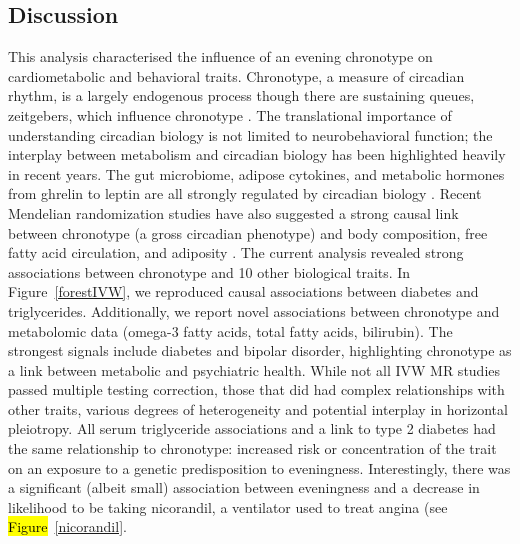 \documentclass[genes,article,accept,moreauthors,pdftex]{Definitions/mdpi}
\begin{document}
\begin{paracol}{2}
\section{Discussion}

This analysis characterised the influence of an evening chronotype on cardiometabolic and behavioral traits. Chronotype, a measure of circadian rhythm, is a largely endogenous process though there are sustaining queues, zeitgebers, which influence chronotype \cite{albrecht_timing_2012}. The translational importance of understanding circadian biology is not limited to neurobehavioral function; the interplay between metabolism and circadian biology has been highlighted heavily in recent years. The gut microbiome, adipose cytokines, and metabolic hormones from ghrelin to leptin are all strongly regulated by circadian biology \cite{li_circadian_2020,socaciu_melatonin_2020,pan_circadian_2020}. Recent Mendelian randomization studies have also suggested a strong causal link between chronotype (a gross circadian phenotype) and body composition, free fatty acid circulation, and adiposity \cite{adams_evaluating_2019,jones_genome-wide_2019}. The current analysis revealed strong associations between chronotype and 10 other biological traits. In Figure~\ref{forestIVW}, we reproduced causal associations between diabetes and triglycerides. Additionally, we report novel associations  between chronotype and metabolomic data (omega-3 fatty acids, total fatty acids, bilirubin). The strongest signals include diabetes and bipolar disorder, highlighting chronotype as a link between metabolic and psychiatric health. While not all IVW MR studies passed multiple testing correction, those that did had complex relationships with other traits, various degrees of heterogeneity and potential interplay in horizontal pleiotropy.
All serum triglyceride associations and a link to type 2 diabetes had the same relationship to chronotype: increased risk or concentration of the trait on an exposure to a genetic predisposition to eveningness. Interestingly, there was a significant (albeit small) association between eveningness and a decrease in likelihood to be taking nicorandil, a ventilator used to treat angina (see \hl{Figure}~\ref{nicorandil}. %

\end{paracol}
\end{document}

